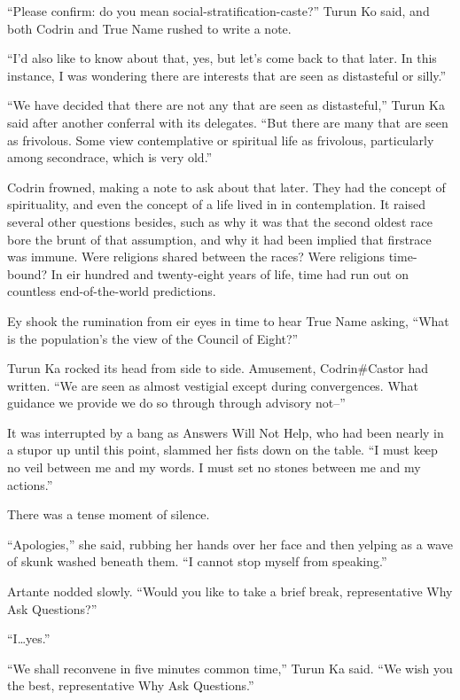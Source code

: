 ``Please confirm: do you mean social-stratification-caste?'' Turun Ko said, and both Codrin and True Name rushed to write a note.

``I'd also like to know about that, yes, but let's come back to that later. In this instance, I was wondering there are interests that are seen as distasteful or silly.''

``We have decided that there are not any that are seen as distasteful,'' Turun Ka said after another conferral with its delegates. ``But there are many that are seen as frivolous. Some view contemplative or spiritual life as frivolous, particularly among secondrace, which is very old.''

Codrin frowned, making a note to ask about that later. They had the concept of spirituality, and even the concept of a life lived in in contemplation. It raised several other questions besides, such as why it was that the second oldest race bore the brunt of that assumption, and why it had been implied that firstrace was immune. Were religions shared between the races? Were religions time-bound? In eir hundred and twenty-eight years of life, time had run out on countless end-of-the-world predictions.

Ey shook the rumination from eir eyes in time to hear True Name asking, ``What is the population's the view of the Council of Eight?''

Turun Ka rocked its head from side to side. Amusement, Codrin\#Castor had written. ``We are seen as almost vestigial except during convergences. What guidance we provide we do so through through advisory not--''

It was interrupted by a bang as Answers Will Not Help, who had been nearly in a stupor up until this point, slammed her fists down on the table. ``I must keep no veil between me and my words. I must set no stones between me and my actions.''

There was a tense moment of silence.

``Apologies,'' she said, rubbing her hands over her face and then yelping as a wave of skunk washed beneath them. ``I cannot stop myself from speaking.''

Artante nodded slowly. ``Would you like to take a brief break, representative Why Ask Questions?''

``I\ldots yes.''

``We shall reconvene in five minutes common time,'' Turun Ka said. ``We wish you the best, representative Why Ask Questions.''

